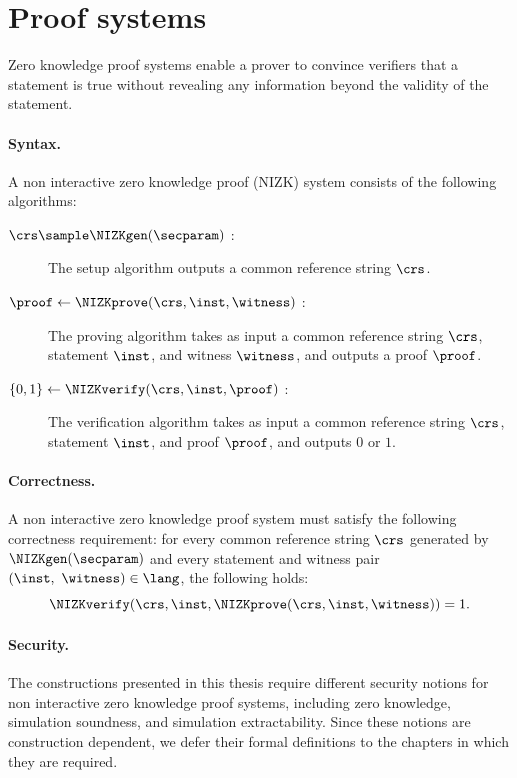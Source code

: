 \section{Proof systems}\label{sec:prelims-nizks}

Zero knowledge proof systems enable a prover to convince verifiers that a
statement is true without revealing any information beyond the validity of the
statement.

\paragraph{Syntax.} A non interactive zero knowledge proof (NIZK) system
consists of the following algorithms:

\begin{description}

  \item[$\crs \sample \NIZKgen(\secparam)$ :] The setup algorithm outputs a
    common reference string $\crs$.

  \item[$\proof \leftarrow \NIZKprove(\crs, \inst, \witness)$ :] The proving
    algorithm takes as input a common reference string $\crs$, statement
    $\inst$, and witness $\witness$, and outputs a proof $\proof$.

  \item[$\{0, 1\} \leftarrow \NIZKverify(\crs, \inst, \proof)$ :] The
    verification algorithm takes as input a common reference string $\crs$,
    statement $\inst$, and proof $\proof$, and outputs $0$ or $1$.

\end{description}

\paragraph{Correctness.} A non interactive zero knowledge proof system must
satisfy the following correctness requirement: for every common reference
string $\crs$ generated by $\NIZKgen(\secparam)$ and every statement and
witness pair $(\inst, \ \witness) \in \lang$, the following holds:
%
\begin{equation*}
%
  \NIZKverify(\crs, \inst, \NIZKprove(\crs, \inst, \witness)) = 1.
%
\end{equation*}
%
\paragraph{Security.} The constructions presented in this thesis require
different security notions for non interactive zero knowledge proof systems,
including zero knowledge, simulation soundness, and simulation extractability.
Since these notions are construction dependent, we defer their formal
definitions to the chapters in which they are required.
